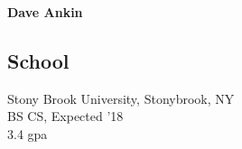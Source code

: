 \documentclass{res}
\begin{document}
 

\begin{center}{\bf\LARGE Dave Ankin}\end{center}
\address{\bf  Where am i\\5 Patriot Court\\Stony Brook, NY 11790\\(267) 992-5122}
\address{}
                                  
\begin{resume}
 
\section{School}          
    Stony Brook University, Stonybrook, NY  \\        
    BS CS, Expected '18   \\       
    3.4 gpa
 

\end{resume}
\end{document}
